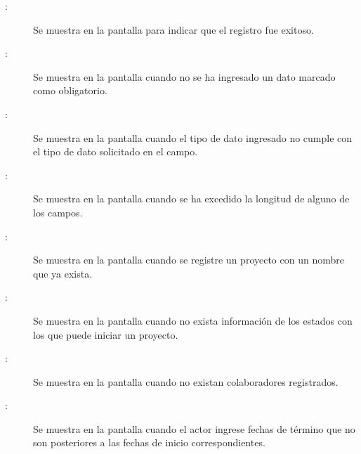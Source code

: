 \begin{description}
	\item[:] Se muestra en la pantalla  para indicar que el registro fue exitoso.
	\item[:] Se muestra en la pantalla  cuando no se ha ingresado un dato marcado como obligatorio.
	\item[:] Se muestra en la pantalla  cuando el tipo de dato ingresado no cumple con el tipo de dato solicitado en el campo.
	\item[:] Se muestra en la pantalla  cuando se ha excedido la longitud de alguno de los campos.
	\item[:] Se muestra en la pantalla  cuando se registre un proyecto con un nombre que ya exista.
	\item[:] Se muestra en la pantalla  cuando no exista información de los estados con los que puede iniciar un proyecto.
	\item[:] Se muestra en la pantalla  cuando no existan colaboradores registrados.
	\item[:] Se muestra en la pantalla  cuando el actor ingrese fechas de término que no son posteriores a las fechas de inicio correspondientes.
\end{description}
